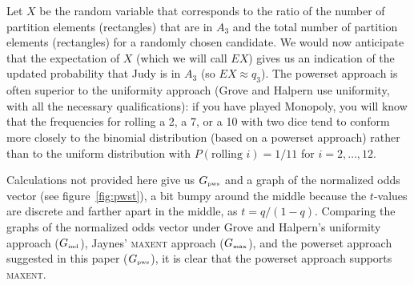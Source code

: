 \documentclass[12pt]{article}
\begin{document}
Let $X$ be the random variable that corresponds to the ratio of the
number of partition elements (rectangles) that are in $A_{3}$ and the
total number of partition elements (rectangles) for a randomly chosen
candidate. We would now anticipate that the expectation of $X$ (which
we will call $EX$) gives us an indication of the updated probability
that Judy is in $A_{3}$ (so $EX\approx{}q_{3}$). The powerset approach
is often superior to the uniformity approach (Grove and Halpern use
uniformity, with all the necessary qualifications): if you have played
Monopoly, you will know that the frequencies for rolling a 2, a 7, or
a 10 with two dice tend to conform more closely to the binomial
distribution (based on a powerset approach) rather than to the uniform
distribution with $P(\mbox{rolling }i)=1/11$ for $i=2,{\ldots},12$.


Calculations not provided here give us $G_{\mbox{\tiny pws}}$ and a
graph of the normalized odds vector (see figure~\ref{fig:pwst}), a bit
bumpy around the middle because the $t$-values are discrete and
farther apart in the middle, as $t=q/(1-q)$. Comparing the graphs of
the normalized odds vector under Grove and Halpern's uniformity
approach ($G_{\mbox{\tiny ind}}$), Jaynes' \textsc{maxent} approach
($G_{\mbox{\tiny max}}$), and the powerset approach suggested in this
paper ($G_{\mbox{\tiny pws}}$), it is clear that the powerset approach
supports \textsc{maxent}.
\end{document}
